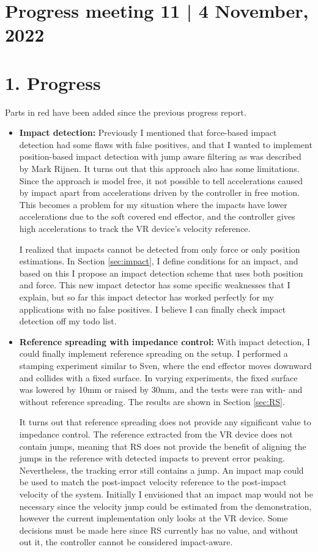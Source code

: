 \documentclass[11pt]{report}
\numberwithin{equation}{section}        %
\numberwithin{figure}{section}          %
\numberwithin{table}{section}           %
\begin{document}
  \section*{Progress meeting 11 | 4 November, 2022}


  \section*{1. Progress}
  Parts in red have been added since the previous progress report.
  \begin{itemize}
  
  \item \textbf{Impact detection:} Previously I mentioned that force-based impact detection had some flaws with false positives, and that I wanted to implement position-based impact detection with jump aware filtering as was described by Mark Rijnen. It turns out that this approach also has some limitations. Since the approach is model free, it not possible to tell accelerations caused by impact apart from accelerations driven by the controller in free motion. This becomes a problem for my situation where the impacts have lower accelerations due to the soft covered end effector, and the controller gives high accelerations to track the VR device's velocity reference.

  I realized that impacts cannot be detected from only force or only position estimations. In Section \ref{sec:impact}, I define conditions for an impact, and based on this I propose an impact detection scheme that uses both position and force. This new impact detector has some specific weaknesses that I explain, but so far this impact detector has worked perfectly for my applications with no false positives. I believe I can finally check impact detection off my todo list.

  \item \textbf{Reference spreading with impedance control:} With impact detection, I could finally implement reference spreading on the setup. I performed a stamping experiment similar to Sven, where the end effector moves downward and collides with a fixed surface. In varying experiments, the fixed surface was lowered by 10mm or raised by 30mm, and the tests were ran with- and without reference spreading. The results are shown in Section \ref{sec:RS}.

  It turns out that reference spreading does not provide any significant value to impedance control. The reference extracted from the VR device does not contain jumps, meaning that RS does not provide the benefit of aligning the jumps in the reference with detected impacts to prevent error peaking. Nevertheless, the tracking error still contains a jump. An impact map could be used to match the post-impact velocity reference to the post-impact velocity of the system. Initially I envisioned that an impact map would not be necessary since the velocity jump could be estimated from the demonstration, however the current implementation only looks at the VR device. Some decisions must be made here since RS currently has no value, and without out it, the controller cannot be considered impact-aware.


\end{itemize}
\end{document}
